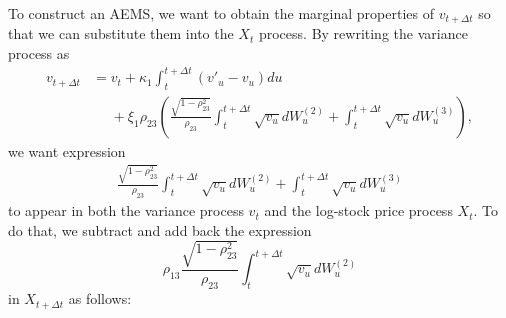 \documentclass[graybox]{svmult}
\begin{document}
To construct an AEMS, we want to obtain the marginal properties of $v_{t+\Delta t}$ so that we can substitute them into the $X_t$ process. By rewriting the variance process as
\begin{align*}
    v_{t+\Delta t} & = v_t + \kappa_1 \int_{t}^{t+\Delta t} (v'_u - v_u) du \\
    & \phantom{=}+ \xi_1 \rho_{23} \left( \frac{\sqrt{1-\rho_{23}^2}}{\rho_{23}} \int_{t}^{t+\Delta t} \sqrt{v_u} dW_u^{(2)} + \int_{t}^{t+\Delta t} \sqrt{v_u} dW_u^{(3)} \right),
\end{align*}
we want expression
\begin{align*}
    \frac{\sqrt{1-\rho_{23}^2}}{\rho_{23}} \int_{t}^{t+\Delta t} \sqrt{v_u} dW_u^{(2)} + \int_{t}^{t+\Delta t} \sqrt{v_u} dW_u^{(3)}
\end{align*}
to appear in both the variance process $v_t$ and the log-stock price process $X_t$. To do that, we subtract and add back the expression
$$
\rho_{13} \frac{\sqrt{1-\rho_{23}^2}}{\rho_{23}} \int_{t}^{t+\Delta t} \sqrt{v_u} dW_u^{(2)}
$$
in $X_{t+\Delta t}$ as follows:
\end{document}
